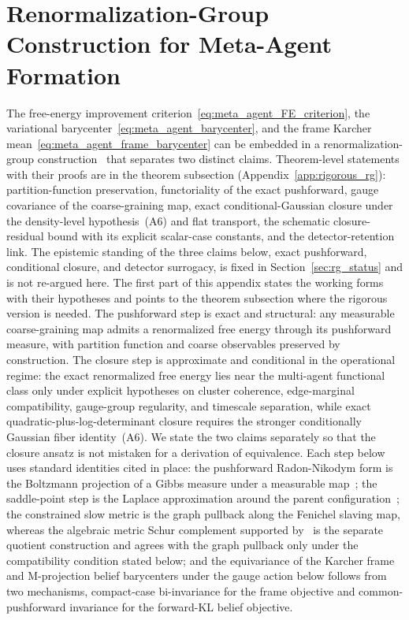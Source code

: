\documentclass[11pt]{article}
\begin{document}
\section{Renormalization-Group Construction for Meta-Agent Formation}
\label{sec:meta_agent_rg}

The free-energy improvement criterion~\eqref{eq:meta_agent_FE_criterion}, the variational barycenter~\eqref{eq:meta_agent_barycenter}, and the frame Karcher mean~\eqref{eq:meta_agent_frame_barycenter} can be embedded in a renormalization-group construction~\cite{Wilson1971, Cardy1996} that separates two distinct claims. Theorem-level statements with their proofs are in the theorem subsection (Appendix~\ref{app:rigorous_rg}): partition-function preservation, functoriality of the exact pushforward, gauge covariance of the coarse-graining map, exact conditional-Gaussian closure under the density-level hypothesis~(A6) and flat transport, the schematic closure-residual bound with its explicit scalar-case constants, and the detector-retention link. The epistemic standing of the three claims below, exact pushforward, conditional closure, and detector surrogacy, is fixed in Section~\ref{sec:rg_status} and is not re-argued here. The first part of this appendix states the working forms with their hypotheses and points to the theorem subsection where the rigorous version is needed. The pushforward step is exact and structural: any measurable coarse-graining map admits a renormalized free energy through its pushforward measure, with partition function and coarse observables preserved by construction. The closure step is approximate and conditional in the operational regime: the exact renormalized free energy lies near the multi-agent functional class only under explicit hypotheses on cluster coherence, edge-marginal compatibility, gauge-group regularity, and timescale separation, while exact quadratic-plus-log-determinant closure requires the stronger conditionally Gaussian fiber identity~(A6). We state the two claims separately so that the closure ansatz is not mistaken for a derivation of equivalence. Each step below uses standard identities cited in place: the pushforward Radon-Nikodym form is the Boltzmann projection of a Gibbs measure under a measurable map~\cite{Cardy1996}; the saddle-point step is the Laplace approximation around the parent configuration~\cite{Cardy1996}; the constrained slow metric is the graph pullback along the Fenichel slaving map, whereas the algebraic metric Schur complement supported by~\cite{HornJohnson2013} is the separate quotient construction and agrees with the graph pullback only under the compatibility condition stated below; and the equivariance of the Karcher frame and M-projection belief barycenters under the gauge action below follows from two mechanisms, compact-case bi-invariance for the frame objective and common-pushforward invariance for the forward-KL belief objective.
\end{document}
